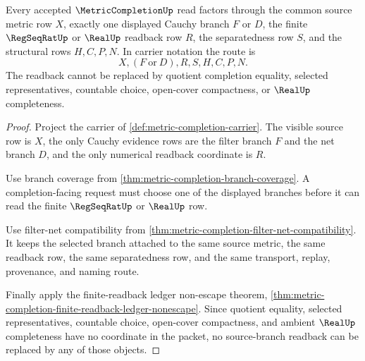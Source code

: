 \begin{theorem}
\label{thm:metric-completion-source-branch-readback}
Every accepted $\MetricCompletionUp$ read factors through the common source metric row $X$, exactly one displayed Cauchy branch $F$ or $D$, the finite $\RegSeqRatUp$ or $\RealUp$ readback row $R$, the separatedness row $S$, and the structural rows $H,C,P,N$. In carrier notation the route is
$$
X,(F\ \text{or}\ D),R,S,H,C,P,N .
$$
The readback cannot be replaced by quotient completion equality, selected representatives, countable choice, open-cover compactness, or $\RealUp$ completeness.
\end{theorem}
\begin{proof}
Project the carrier of \autoref{def:metric-completion-carrier}. The visible source row is $X$, the only Cauchy evidence rows are the filter branch $F$ and the net branch $D$, and the only numerical readback coordinate is $R$.

Use branch coverage from \autoref{thm:metric-completion-branch-coverage}. A completion-facing request must choose one of the displayed branches before it can read the finite $\RegSeqRatUp$ or $\RealUp$ row.

Use filter-net compatibility from \autoref{thm:metric-completion-filter-net-compatibility}. It keeps the selected branch attached to the same source metric, the same readback row, the same separatedness row, and the same transport, replay, provenance, and naming route.

Finally apply the finite-readback ledger non-escape theorem, \autoref{thm:metric-completion-finite-readback-ledger-nonescape}. Since quotient equality, selected representatives, countable choice, open-cover compactness, and ambient $\RealUp$ completeness have no coordinate in the packet, no source-branch readback can be replaced by any of those objects.
\end{proof}

